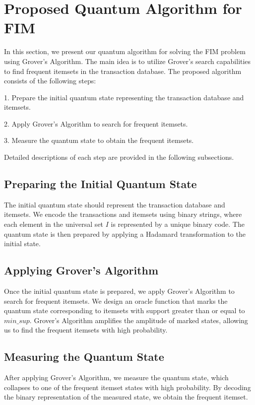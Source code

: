 \section{Proposed Quantum Algorithm for FIM}\label{sec:proposed_algorithm}

In this section, we present our quantum algorithm for solving the FIM problem using Grover's Algorithm. The main idea is to utilize Grover's search capabilities to find frequent itemsets in the transaction database. The proposed algorithm consists of the following steps:

1. Prepare the initial quantum state representing the transaction database and itemsets.

2. Apply Grover's Algorithm to search for frequent itemsets.

3. Measure the quantum state to obtain the frequent itemsets.

Detailed descriptions of each step are provided in the following subsections.

\subsection{Preparing the Initial Quantum State}

The initial quantum state should represent the transaction database and itemsets. We encode the transactions and itemsets using binary strings, where each element in the universal set $I$ is represented by a unique binary code. The quantum state is then prepared by applying a Hadamard transformation to the initial state.

\subsection{Applying Grover's Algorithm}

Once the initial quantum state is prepared, we apply Grover's Algorithm to search for frequent itemsets. We design an oracle function that marks the quantum state corresponding to itemsets with support greater than or equal to $min\_sup$. Grover's Algorithm amplifies the amplitude of marked states, allowing us to find the frequent itemsets with high probability.

\subsection{Measuring the Quantum State}

After applying Grover's Algorithm, we measure the quantum state, which collapses to one of the frequent itemset states with high probability. By decoding the binary representation of the measured state, we obtain the frequent itemset.

